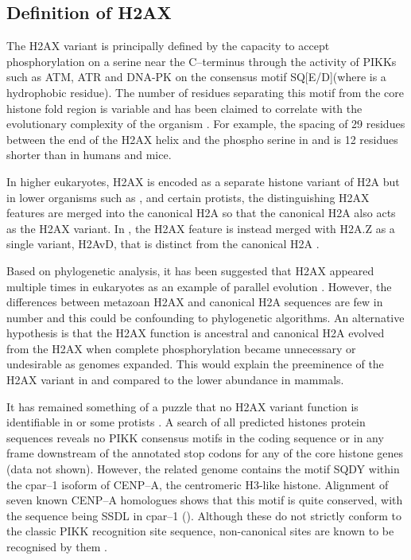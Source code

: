 \subsection{Definition of H2AX}
\label{subsec:h2ax-review:relation-H2A-H2AX}
The H2AX variant is principally defined by the capacity to accept phosphorylation on a serine near
the C--terminus through the activity of PIKKs such as ATM, ATR and DNA-PK on the consensus motif
SQ[E/D]\textPhi (where \textPhi is a hydrophobic residue). The number of residues separating this
motif from the core histone fold region is variable and has been claimed to correlate with the
evolutionary complexity of the organism \citep{CRDP+02}. For example, the spacing of 29 residues
between the end of the H2AX  helix and the phospho serine in 
and  is 12 residues shorter than in humans and mice.

In higher eukaryotes, H2AX is encoded as a separate histone variant of H2A but in lower organisms
such as ,  and certain protists, the distinguishing H2AX
features are merged into the canonical H2A \citep{HSM03,SJN06} so that the canonical H2A also acts as
the H2AX variant. In , the H2AX feature is instead merged with H2A.Z
as a single variant, H2AvD, that is distinct from the canonical H2A \citep{MCG02}.

Based on phylogenetic analysis, it has been suggested that H2AX appeared multiple times in
eukaryotes as an example of parallel evolution \citep{HSM03}. However, the differences between
metazoan H2AX and canonical H2A sequences are few in number and this could be confounding to
phylogenetic algorithms. An alternative hypothesis is that the  H2AX function is ancestral and
canonical H2A evolved from the H2AX when complete phosphorylation became unnecessary or undesirable
as genomes expanded. This would explain the preeminence of the H2AX variant in 
and  compared to the lower abundance in mammals.

It has remained something of a puzzle that no H2AX variant function is identifiable in
 \citep{HSM03} or some protists \citep{SJN06}. A search of all predicted
 histones protein sequences reveals no PIKK consensus motifs in the coding
sequence or in any frame downstream of the annotated stop codons for any of the core histone genes
(data not shown). However, the related  genome contains the motif SQDY within the
\mbox{cpar--1} isoform of \mbox{CENP--A}, the centromeric \mbox{H3-like} histone. Alignment of seven
known  \mbox{CENP--A} homologues shows that this motif is quite conserved, with
the sequence being SSDL in  \mbox{cpar--1} (). Although
these do not strictly conform to the classic PIKK recognition site sequence, non-canonical sites are
known to be recognised by them \citep{SYC+05}.

